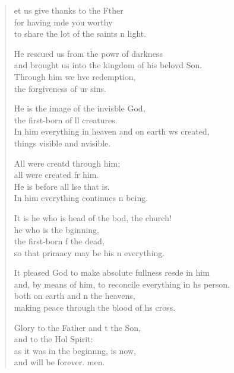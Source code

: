 \settowidth{\versewidth}{and, by means of him, to reconcile everything in his person,}
\begin{verse}%
  \begin{patverse}
et us give thanks to the Fther\Flex\\
for having mde you worthy\Med\\
to share the lot of the saints \pointup{\i}n light.

He rescued us from the powr of darkness\Med\\
and brought us into the kingdom of his belovd Son.\\
Through him we hve redemption,\Med\\
the forgiveness of ur sins.

He is the image of the invis\pointup{\i}ble God,\Med\\
the first-born of ll creatures.\\
In him everything in heaven and on earth ws created,\Med\\
things visible and \pointup{\i}nvisible.

All were creatd through him;\Med\\
all were created fr him.\\
He is before all lse that is.\Med\\
In him everything continues \pointup{\i}n being.

It is he who is head of the bod, the church!\Med\\
he who is the bginning,\\
the first-born f the dead,\Med\\
so that primacy may be his \pointup{\i}n everything.

It pleased God to make absolute fullness res\pointup{\i}de in him\Med\\
and, by means of him, to reconcile everything in h\pointup{\i}s person,\\
both on earth and \pointup{\i}n the heavens,\Med\\
making peace through the blood of h\pointup{\i}s cross.

Glory to the Father and t the Son,\Med\\
and to the Hol Spirit:\\
as it was in the beginn\pointup{\i}ng, is now,\Med\\
and will be forever. men. 
  \end{patverse}
\end{verse}

